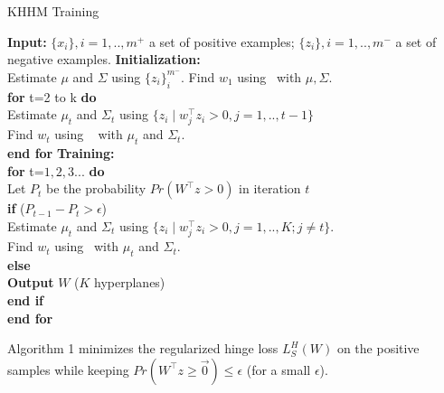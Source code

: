 \documentclass[twoside,11pt]{article}
\begin{document}
\begin{algorithm}
 \begin{algorithmic}
 \caption{KHHM Training}
 \STATE \textbf{Input:} $\{x_i\}, i=1,..,m^+$ a set of positive examples; $\{z_i\}, i=1,..,m^-$ a set of negative examples.
 \STATE
 \STATE \textbf{Initialization:} \\\hspace{0.5cm} Estimate  $\mu$ and $\Sigma$ using $\{z_i\}_i^{m^-}$. Find $w_1$ using~\cite{OsadchyKR16}  with $\mu, \Sigma$.\\\hspace{0.5cm}
     \textbf{for } {t=2 to k} \textbf{do} \\\hspace{1cm}
        Estimate  $\mu_t$ and $\Sigma_t$ using $\{z_i\mid w_j^\top z_i>0, j=1,..,t-1 \}$\\\hspace{1cm}
        Find $w_t$ using ~\cite{OsadchyKR16} with $\mu_t$ and $\Sigma_t$. \\\hspace{0.5cm}
     \textbf{end for}
 \STATE
 \STATE \textbf{Training:}\\\hspace{0.5cm}
 \textbf{for } {t=$1,2,3...$} \textbf{do} \\\hspace{1cm}
   Let $P_t$ be the probability $Pr(W^\top z>0)$ in iteration $t$\\\hspace{1cm}
   \textbf{if }($P_{t-1}-P_t>\epsilon$)\\\hspace{1.5cm}
      Estimate  $\mu_t$ and $\Sigma_t$ using $\{z_i\mid w_j^\top z_i>0, j=1,..,K; j\neq t \}$.\\\hspace{1.5cm}
      Find $w_t$ using~\cite{OsadchyKR16} with $\mu_t$ and $\Sigma_t$.\\\hspace{1cm}
   \textbf{else }\\\hspace{1.5cm}
   \textbf{Output} $W$ ($K$ hyperplanes)\\\hspace{1cm}
   \textbf{end if}\\\hspace{0.5cm}
   \textbf{end for}
 \end{algorithmic}
 \end{algorithm}
 \begin{lemma}
   Algorithm 1 minimizes the regularized hinge loss $L_S^{H}(W)$ on the positive samples while keeping $Pr(W^\top z\geq \vec{0})\leq \epsilon$ (for a small $\epsilon$).
 \end{lemma}
\end{document}
